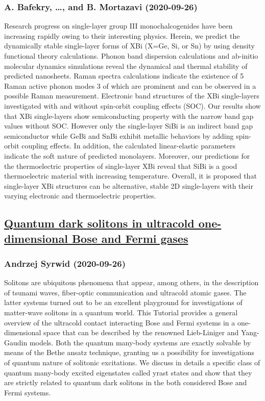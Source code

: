 \subsubsection*{A. Bafekry, \dots, and B. Mortazavi (2020-09-26)}
Research progress on single-layer group III monochalcogenides have been
increasing rapidly owing to their interesting physics. Herein, we predict the
dynamically stable single-layer forms of XBi (X=Ge, Si, or Sn) by using density
functional theory calculations. Phonon band dispersion calculations and
ab-initio molecular dynamics simulations reveal the dynamical and thermal
stability of predicted nanosheets. Raman spectra calculations indicate the
existence of 5 Raman active phonon modes 3 of which are prominent and can be
observed in a possible Raman measurement. Electronic band structures of the XBi
single-layers investigated with and without spin-orbit coupling effects (SOC).
Our results show that XBi single-layers show semiconducting property with the
narrow band gap values without SOC. However only the single-layer SiBi is an
indirect band gap semiconductor while GeBi and SnBi exhibit metallic behaviors
by adding spin-orbit coupling effects. In addition, the calculated
linear-elastic parameters indicate the soft nature of predicted monolayers.
Moreover, our predictions for the thermoelectric properties of single-layer XBi
reveal that SiBi is a good thermoelectric material with increasing temperature.
Overall, it is proposed that single-layer XBi structures can be alternative,
stable 2D single-layers with their varying electronic and thermoelectric
properties.

\subsection*{\href{http://arxiv.org/abs/2009.12554v2}{Quantum dark solitons in ultracold one-dimensional Bose and Fermi gases}}
\subsubsection*{Andrzej Syrwid (2020-09-26)}
Solitons are ubiquitous phenomena that appear, among others, in the
description of tsunami waves, fiber-optic communication and ultracold atomic
gases. The latter systems turned out to be an excellent playground for
investigations of matter-wave solitons in a quantum world. This Tutorial
provides a general overview of the ultracold contact interacting Bose and Fermi
systems in a one-dimensional space that can be described by the renowned
Lieb-Liniger and Yang-Gaudin models. Both the quantum many-body systems are
exactly solvable by means of the Bethe ansatz technique, granting us a
possibility for investigations of quantum nature of solitonic excitations. We
discuss in details a specific class of quantum many-body excited eigenstates
called yrast states and show that they are strictly related to quantum dark
solitons in the both considered Bose and Fermi systems.


